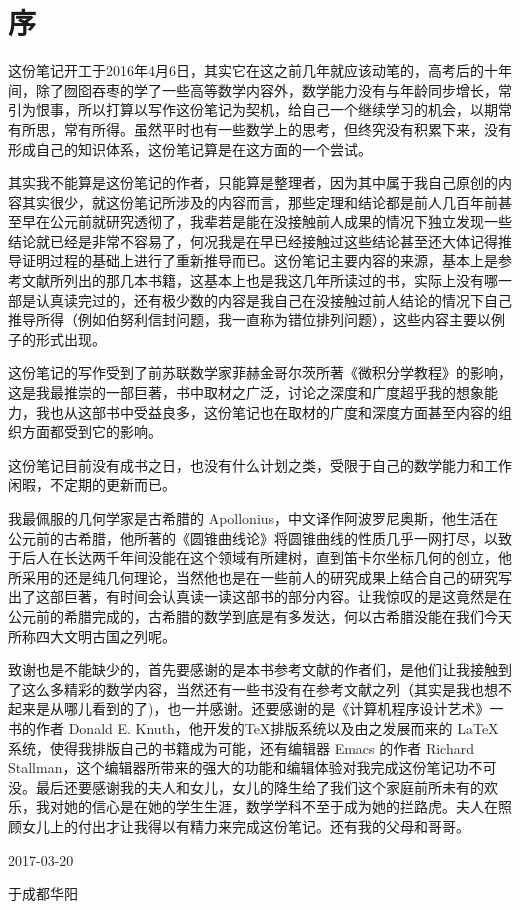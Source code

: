 
\chapter*{序}

这份笔记开工于2016年4月6日，其实它在这之前几年就应该动笔的，高考后的十年间，除了囫囵吞枣的学了一些高等数学内容外，数学能力没有与年龄同步增长，常引为恨事，所以打算以写作这份笔记为契机，给自己一个继续学习的机会，以期常有所思，常有所得。虽然平时也有一些数学上的思考，但终究没有积累下来，没有形成自己的知识体系，这份笔记算是在这方面的一个尝试。

其实我不能算是这份笔记的作者，只能算是整理者，因为其中属于我自己原创的内容其实很少，就这份笔记所涉及的内容而言，那些定理和结论都是前人几百年前甚至早在公元前就研究透彻了，我辈若是能在没接触前人成果的情况下独立发现一些结论就已经是非常不容易了，何况我是在早已经接触过这些结论甚至还大体记得推导证明过程的基础上进行了重新推导而已。这份笔记主要内容的来源，基本上是参考文献所列出的那几本书籍，这基本上也是我这几年所读过的书，实际上没有哪一部是认真读完过的，还有极少数的内容是我自己在没接触过前人结论的情况下自己推导所得（例如伯努利信封问题，我一直称为错位排列问题），这些内容主要以例子的形式出现。

这份笔记的写作受到了前苏联数学家菲赫金哥尔茨所著《微积分学教程》的影响，这是我最推崇的一部巨著，书中取材之广泛，讨论之深度和广度超乎我的想象能力，我也从这部书中受益良多，这份笔记也在取材的广度和深度方面甚至内容的组织方面都受到它的影响。

这份笔记目前没有成书之日，也没有什么计划之类，受限于自己的数学能力和工作闲暇，不定期的更新而已。

我最佩服的几何学家是古希腊的 Apollonius，中文译作阿波罗尼奥斯，他生活在公元前的古希腊，他所著的《圆锥曲线论》将圆锥曲线的性质几乎一网打尽，以致于后人在长达两千年间没能在这个领域有所建树，直到笛卡尔坐标几何的创立，他所采用的还是纯几何理论，当然他也是在一些前人的研究成果上结合自己的研究写出了这部巨著，有时间会认真读一读这部书的部分内容。让我惊叹的是这竟然是在公元前的希腊完成的，古希腊的数学到底是有多发达，何以古希腊没能在我们今天所称四大文明古国之列呢。

致谢也是不能缺少的，首先要感谢的是本书参考文献的作者们，是他们让我接触到了这么多精彩的数学内容，当然还有一些书没有在参考文献之列（其实是我也想不起来是从哪儿看到的了)，也一并感谢。还要感谢的是《计算机程序设计艺术》一书的作者 Donald E. Knuth，他开发的\TeX 排版系统以及由之发展而来的 \LaTeX 系统，使得我排版自己的书籍成为可能，还有编辑器 Emacs 的作者 Richard Stallman，这个编辑器所带来的强大的功能和编辑体验对我完成这份笔记功不可没。最后还要感谢我的夫人和女儿，女儿的降生给了我们这个家庭前所未有的欢乐，我对她的信心是在她的学生生涯，数学学科不至于成为她的拦路虎。夫人在照顾女儿上的付出才让我得以有精力来完成这份笔记。还有我的父母和哥哥。

\vspace{1.5cm}

\hfill 2017-03-20 \ \ \ \ \ 

\hfill 于成都华阳 \ \ \ \ \ 


